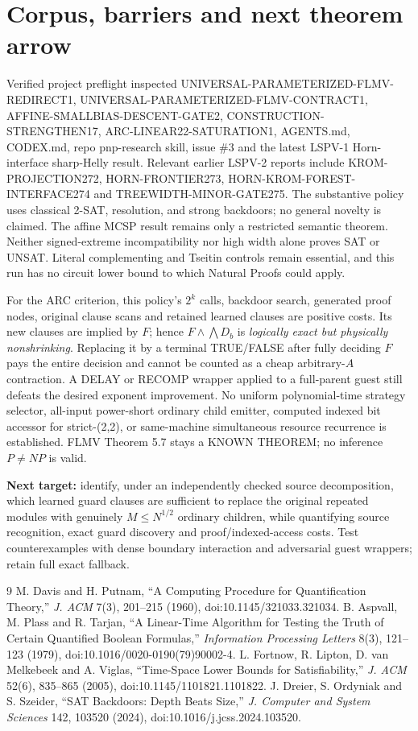 \documentclass[11pt]{article}
\begin{document}
\section{Corpus, barriers and next theorem arrow}
Verified project preflight inspected UNIVERSAL-PARAMETERIZED-FLMV-REDIRECT1, UNIVERSAL-PARAMETERIZED-FLMV-CONTRACT1, AFFINE-SMALLBIAS-DESCENT-GATE2, CONSTRUCTION-STRENGTHEN17, ARC-LINEAR22-SATURATION1, AGENTS.md, CODEX.md, repo pnp-research skill, issue \#3 and the latest LSPV-1 Horn-interface sharp-Helly result. Relevant earlier LSPV-2 reports include KROM-PROJECTION272, HORN-FRONTIER273, HORN-KROM-FOREST-INTERFACE274 and TREEWIDTH-MINOR-GATE275. The substantive policy uses classical 2-SAT, resolution, and strong backdoors; no general novelty is claimed. The affine MCSP result remains only a restricted semantic theorem. Neither signed-extreme incompatibility nor high width alone proves SAT or UNSAT. Literal complementing and Tseitin controls remain essential, and this run has no circuit lower bound to which Natural Proofs could apply.

For the ARC criterion, this policy's $2^k$ calls, backdoor search, generated proof nodes, original clause scans and retained learned clauses are positive costs. Its new clauses are implied by $F$; hence $F\land\bigwedge D_b$ is \emph{logically exact but physically nonshrinking}. Replacing it by a terminal TRUE/FALSE after fully deciding $F$ pays the entire decision and cannot be counted as a cheap arbitrary-$A$ contraction. A DELAY or RECOMP wrapper applied to a full-parent guest still defeats the desired exponent improvement. No uniform polynomial-time strategy selector, all-input power-short ordinary child emitter, computed indexed bit accessor for strict-(2,2), or same-machine simultaneous resource recurrence is established. FLMV Theorem 5.7 stays a KNOWN THEOREM; no inference $P\ne NP$ is valid.

\textbf{Next target:} identify, under an independently checked source decomposition, which learned guard clauses are sufficient to replace the original repeated modules with genuinely $M\le N^{1/2}$ ordinary children, while quantifying source recognition, exact guard discovery and proof/indexed-access costs. Test counterexamples with dense boundary interaction and adversarial guest wrappers; retain full exact fallback.\par

\begin{thebibliography}{9}
 M. Davis and H. Putnam, ``A Computing Procedure for Quantification Theory,'' \emph{J. ACM} 7(3), 201--215 (1960), doi:10.1145/321033.321034.
 B. Aspvall, M. Plass and R. Tarjan, ``A Linear-Time Algorithm for Testing the Truth of Certain Quantified Boolean Formulas,'' \emph{Information Processing Letters} 8(3), 121--123 (1979), doi:10.1016/0020-0190(79)90002-4.
 L. Fortnow, R. Lipton, D. van Melkebeek and A. Viglas, ``Time-Space Lower Bounds for Satisfiability,'' \emph{J. ACM} 52(6), 835--865 (2005), doi:10.1145/1101821.1101822.
 J. Dreier, S. Ordyniak and S. Szeider, ``SAT Backdoors: Depth Beats Size,'' \emph{J. Computer and System Sciences} 142, 103520 (2024), doi:10.1016/j.jcss.2024.103520.
\end{thebibliography}
\end{document}
